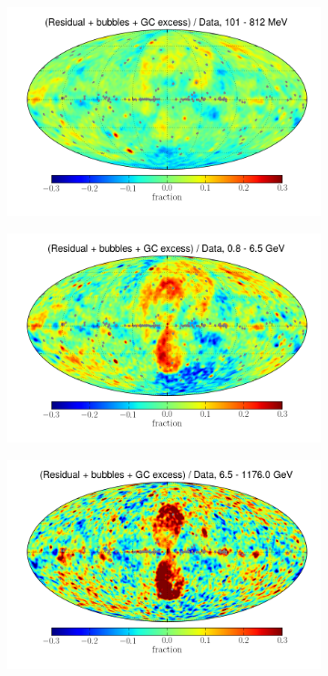 \documentclass[a4paper]{article}
\begin{document}
\begin{figure}
    \begin{subfigure}{0.7\textwidth}
        \includegraphics[width=\textwidth]{Source_refit_3FGL_40PS_resid_signal_frac_bubbles_E101-812MeV_jet}
    \end{subfigure} 
    \begin{subfigure}{0.7\textwidth}
        \includegraphics[width=\textwidth]{Source_refit_3FGL_40PS_resid_signal_frac_bubbles_E0p8-6p5GeV_jet}
    \end{subfigure}
    \begin{subfigure}{0.7\textwidth}
        \includegraphics[width=\textwidth]{Source_refit_3FGL_40PS_resid_signal_frac_bubbles_E6p5-1176p0GeV_jet}

\end{subfigure}
\end{figure}
\end{document}
